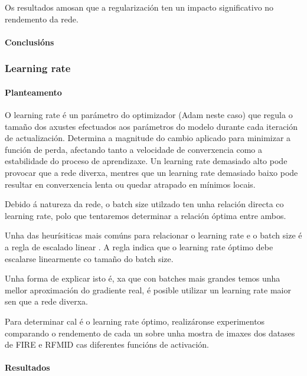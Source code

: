 Os resultados amosan que a regularización ten un impacto significativo no rendemento da rede.

\paragraph{Conclusións}
\label{par:Conclusións}

\subsubsection{Learning rate}
\label{subsubsec:Learning rate}

\paragraph{Planteamento}
\label{par:Planteamento}

O learning rate é un parámetro do optimizador (Adam neste caso) que regula o tamaño dos axustes efectuados aos parámetros do modelo durante cada iteración de actualización. Determina a magnitude do cambio aplicado para minimizar a función de perda, afectando tanto a velocidade de converxencia como a estabilidade do proceso de aprendizaxe.
Un learning rate demasiado alto pode provocar que a rede diverxa, mentres que un learning rate demasiado baixo pode resultar en converxencia lenta ou quedar atrapado en mínimos locais.

Debido á natureza da rede, o batch size utilzado ten unha relación directa co learning rate, polo que tentaremos determinar a relación óptima entre ambos.

Unha das heurísiticas mais comúns para relacionar o learning rate e o batch size é a regla de escalado linear \cite{goyal2018accuratelargeminibatchsgd}. 
A regla indica que o learning rate óptimo debe escalarse linearmente co tamaño do batch size. 

Unha forma de explicar isto é, xa que con batches mais grandes temos unha mellor aproximación do gradiente real, é posible utilizar un learning rate maior sen que a rede diverxa.

Para determinar cal é o learning rate óptimo, realizáronse experimentos comparando o rendemento de cada un sobre unha mostra de imaxes dos datases de FIRE e RFMID cas diferentes funcións de activación.

\paragraph{Resultados}
\label{par:Resultados}

